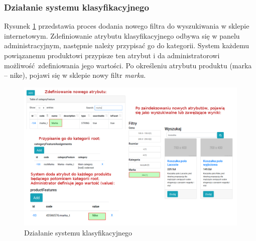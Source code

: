 \subsubsection{Działanie systemu klasyfikacyjnego}
Rysunek \ref{sysklasdzial} przedstawia proces dodania nowego filtra do wyszukiwania w sklepie internetowym. Zdefiniowanie atrybutu klasyfikacyjnego odbywa się w panelu administracyjnym, następnie należy przypisać go do kategorii. System każdemu powiązanemu produktowi przypisze ten atrybut i da administratorowi możliwość zdefiniowania jego wartości. Po określeniu atrybutu produktu (marka -- nike), pojawi się w sklepie nowy filtr \textit{marka}.
\begin{figure}
	\begin{center}
		\includegraphics[scale=0.4]{sysklas-wyszfacet.png}
	\end{center}
	\caption{{\color{black}Działanie systemu klasyfikacyjnego}} \label{sysklasdzial}
\end{figure}

